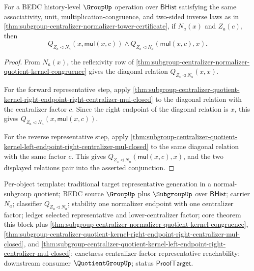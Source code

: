 \begin{theorem}
\label{thm:subgroup-centralizer-quotient-kernel-centralizer-representative-step}
For a BEDC history-level $\GroupUp$ operation over $\mathsf{BHist}$ satisfying
the same associativity, unit, multiplication-congruence, and two-sided inverse
laws as in
\autoref{thm:subgroup-centralizer-normalizer-tower-certificate}, if $N_a(x)$
and $Z_a(c)$, then
$$
Q_{Z_a\triangleleft N_a}(x,\mathsf{mul}(x,c))\land
Q_{Z_a\triangleleft N_a}(\mathsf{mul}(x,c),x).
$$
\end{theorem}
\begin{proof}
From $N_a(x)$, the reflexivity row of
\autoref{thm:subgroup-centralizer-normalizer-quotient-kernel-congruence} gives
the diagonal relation $Q_{Z_a\triangleleft N_a}(x,x)$.

For the forward representative step, apply
\autoref{thm:subgroup-centralizer-quotient-kernel-right-endpoint-right-centralizer-mul-closed}
to the diagonal relation with the centralizer factor $c$. Since the right
endpoint of the diagonal relation is $x$, this gives
$Q_{Z_a\triangleleft N_a}(x,\mathsf{mul}(x,c))$.

For the reverse representative step, apply
\autoref{thm:subgroup-centralizer-quotient-kernel-left-endpoint-right-centralizer-mul-closed}
to the same diagonal relation with the same factor $c$. This gives
$Q_{Z_a\triangleleft N_a}(\mathsf{mul}(x,c),x)$, and the two displayed
relations pair into the asserted conjunction.
\end{proof}

Per-object template: traditional target representative generation in a
normal-subgroup quotient; BEDC source $\GroupUp$ plus $\SubgroupUp$ over
$\mathsf{BHist}$; carrier $N_a$; classifier $Q_{Z_a\triangleleft N_a}$;
stability one normalizer endpoint with one centralizer factor; ledger selected
representative and lower-centralizer factor; core theorem this block plus
\autoref{thm:subgroup-centralizer-normalizer-quotient-kernel-congruence},
\autoref{thm:subgroup-centralizer-quotient-kernel-right-endpoint-right-centralizer-mul-closed},
and
\autoref{thm:subgroup-centralizer-quotient-kernel-left-endpoint-right-centralizer-mul-closed};
exactness centralizer-factor representative reachability; downstream consumer
$\QuotientGroupUp$; status $\mathsf{ProofTarget}$.
